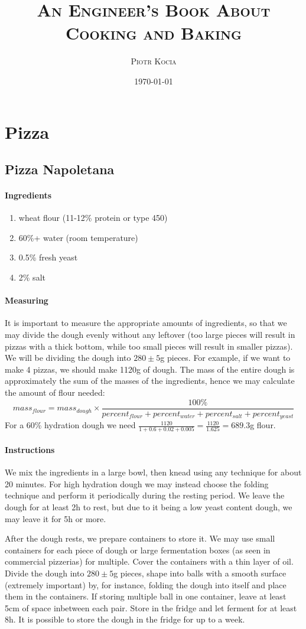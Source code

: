 \documentclass[11pt]{book}
\title{\textsc{{An Engineer's Book About Cooking and Baking}}}
\author{\textsc{Piotr Kocia}}
\date{\textsc{\today}}
\newcommand{\header}[1]{\subsubsection*{#1}}
\begin{document}
\maketitle
\tableofcontents

\newpage





\chapter{Pizza}
\section{Pizza Napoletana}

\header{Ingredients}
\begin{enumerate}
  \item wheat flour (11-12\% protein or type 450)
  \item 60\%+ water (room temperature)
  \item 0.5\% fresh yeast
  \item 2\% salt
\end{enumerate}

\header{Measuring}
It is important to measure the appropriate amounts of ingredients, so that we
may divide the dough evenly without any leftover (too large pieces will result
in pizzas with a thick bottom, while too small pieces will result in smaller
pizzas). We will be dividing the dough into $280 \pm 5$g pieces. For example,
if we want to make 4 pizzas, we should make 1120g of dough. The mass of the
  entire dough is approximately the sum of the masses of the ingredients, hence
  we may calculate the amount of flour needed:
$$
mass_{flour} = mass_{dough} \times \frac{100\%}{ percent_{flour} + percent_{water} + percent_{salt} + percent_{yeast} }
$$
For a 60\% hydration dough we need $\frac{1120}{1 + 0.6 + 0.02 + 0.005} =
\frac{1120}{1.625} = 689.3$g flour.

\header{Instructions}
We mix the ingredients in a large bowl, then knead using any technique for
about 20 minutes. For high hydration dough we may instead choose the folding
technique and perform it periodically during the resting period. We leave the
dough for at least 2h to rest, but due to it being a low yeast content dough,
we may leave it for 5h or more.

After the dough rests, we prepare containers to store it. We may use small
containers for each piece of dough or large fermentation boxes (as seen in
commercial pizzerias) for multiple. Cover the containers with a thin layer of
oil. Divide the dough into $280 \pm 5$g pieces, shape into balls with a smooth
surface (extremely important) by, for instance, folding the dough into itself
and place them in the containers. If storing multiple ball in one container,
leave at least 5cm of space inbetween each pair. Store in the fridge and let
ferment for at least 8h. It is possible to store the dough in the fridge for up
to a week.
\end{document}
